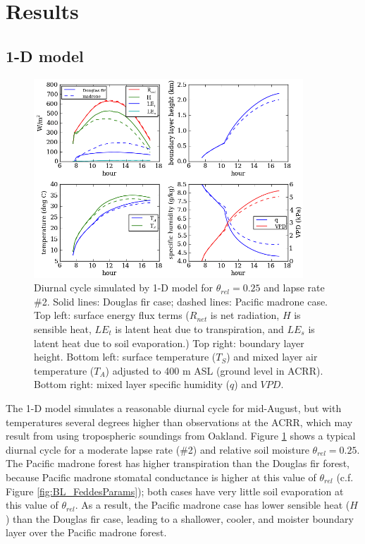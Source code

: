 \section{Results}

\subsection{1-D model}

\begin{figure}[here]
\includegraphics[width=0.9\textwidth]{ch2-BL/figures/testall_Aug15_soilm0pt25_ra10_lapseT2_cropped.png}
\caption{Diurnal cycle simulated by 1-D model for $\theta_{rel}=0.25$ and lapse rate \#2.  Solid lines: Douglas fir case; dashed lines: Pacific madrone case.  Top left: surface energy flux terms ($R_{net}$ is net radiation, $H$ is sensible heat, $LE_t$ is latent heat due to transpiration, and $LE_s$ is latent heat due to soil evaporation.)  Top right: boundary layer height.  Bottom left: surface temperature ($T_S$) and mixed layer air temperature ($T_A$) adjusted to 400 m ASL (ground level in ACRR).  Bottom right: mixed layer specific humidity ($q$) and $VPD$.}
\label{fig:BL_1Ddiurnal}
\end{figure}

The 1-D model simulates a reasonable diurnal cycle for mid-August, but with temperatures several degrees higher than observations at the ACRR, which may result from using tropospheric soundings from Oakland.  Figure \ref{fig:BL_1Ddiurnal} shows a typical diurnal cycle for a moderate lapse rate (\#2) and relative soil moisture $\theta_{rel} = 0.25$.  The Pacific madrone forest has higher transpiration than the Douglas fir forest, because Pacific madrone stomatal conductance is higher at this value of $\theta_{rel}$ (c.f. Figure \ref{fig:BL_FeddesParams}); both cases have very little soil evaporation at this value of $\theta_{rel}$.  As a result, the Pacific madrone case has lower sensible heat ($H$) than the Douglas fir case, leading to a shallower, cooler, and moister boundary layer over the Pacific madrone forest.

